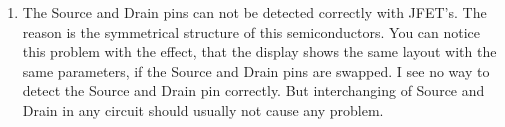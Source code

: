 \begin{enumerate}
\item The Source and Drain pins can not be detected correctly with JFET's.
The reason is the symmetrical structure of this semiconductors.
You can notice this problem with the effect, that the display shows the same layout with the same parameters,
if the Source and Drain pins are swapped.
I see no way to detect the Source and Drain pin correctly.
But interchanging of Source and Drain in any circuit should usually not cause any problem.

\end{enumerate}
